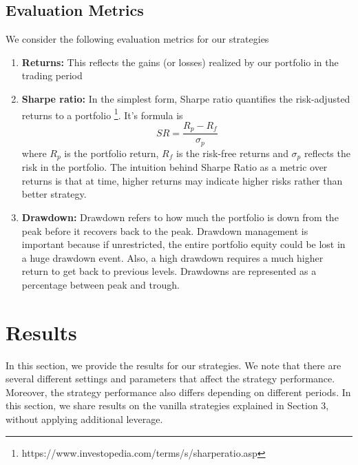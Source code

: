 \documentclass[10pt]{article}
\theoremstyle{definition}
\begin{document}
\subsection{Evaluation Metrics} \label{evalmetrics}
We consider the following evaluation metrics for our strategies
\begin{enumerate}
    \item \textbf{Returns:} This reflects the gains (or losses) realized by our portfolio in the trading period
    \item \textbf{Sharpe ratio:} In the simplest form, Sharpe ratio quantifies the risk-adjusted returns to a portfolio \footnote{https://www.investopedia.com/terms/s/sharperatio.asp}. It's formula is 
    $$
    SR = \frac{R_p- R_f}{\sigma_p}
    $$where $R_p$ is the portfolio return, $R_f$ is the risk-free returns and $\sigma_p$ reflects the risk in the portfolio. The intuition behind Sharpe Ratio as a metric over returns is that at time, higher returns may indicate higher risks rather than better strategy.
    \item \textbf{Drawdown:} Drawdown refers to how much the portfolio is down from the peak before it recovers back to the peak. Drawdown management is important because if unrestricted, the entire portfolio equity could be lost in a huge drawdown event. Also, a high drawdown requires a much higher return to get back to previous levels. Drawdowns are represented as a percentage between peak and trough. 
\end{enumerate}

\section{Results}
In this section, we provide the results for our strategies. We note that there are several different settings and parameters that affect the strategy performance. Moreover, the strategy performance also differs depending on different periods. In this section, we share results on the vanilla strategies explained in Section 3, without applying additional leverage. 
\end{document}
